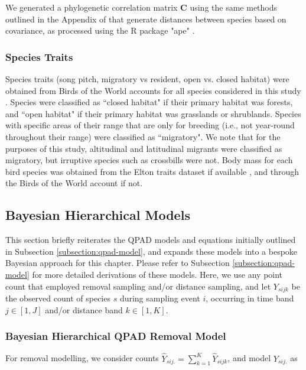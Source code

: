 \par We generated a phylogenetic correlation matrix $\mathbf{C}$ using the same methods outlined in the Appendix of \citet{solymos_phylogeny_2018} that generate distances between species based on covariance, as processed using the R package "ape" \citep{paradis_ape_2019}.

\subsubsection{Species Traits}
\par Species traits (song pitch, migratory vs resident, open vs. closed habitat) were obtained from Birds of the World accounts for all species considered in this study \citep{billerman_birds_2022}. 
Species were classified as ``closed habitat" if their primary habitat was forests, and ``open habitat" if their primary habitat was grasslands or shrublands.
Species with specific areas of their range that are only for breeding (i.e., not year-round throughout their range) were classified as ``migratory".
We note that for the purposes of this study, altitudinal and latitudinal migrants were classified as migratory, but irruptive species such as crossbills were not.
Body mass for each bird species was obtained from the Elton traits dataset if available \citep{wilman_eltontraits_2014}, and through the Birds of the World account \citep{billerman_birds_2022} if not.

\subsection{Bayesian Hierarchical Models}
\par This section briefly reiterates the QPAD models and equations initially outlined in Subsection \ref{subsection:qpad-model}, and expands these models into a bespoke Bayesian approach for this chapter.
Please refer to Subsection \ref{subsection:qpad-model} for more detailed derivations of these models.
Here, we use any point count that employed removal sampling and/or distance sampling, and let $Y_{sijk}$ be the observed count of species $s$ during sampling event $i$, occurring in time band $j \in [1,J]$ and/or distance band $k \in [1,K]$.

\subsubsection{Bayesian Hierarchical QPAD Removal Model}

\par For removal modelling, we consider counts $\hat{Y}_{sij.} = \sum_{k=1}^{K} \hat{Y}_{sijk}$, and model $Y_{sij.}$ as

